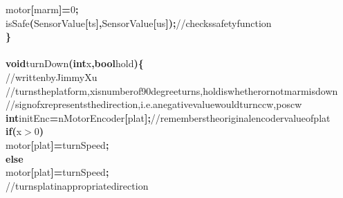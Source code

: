 \documentclass[a4paper, 10pt]{article}
\newcommand\SPC{\hspace*{0.6em}}
\newcommand\TAB{\hspace*{1.2em}}
\newcommand\HYP{\mbox{\char 45}}
\newcommand{\CppAComment}[1]{\textcolor[rgb]{0,0.5,0}{\colorbox[rgb]{1,1,1}{#1}}}
\newcommand{\CppAIdentifier}[1]{#1}
\newcommand{\CppANumber}[1]{\textcolor[rgb]{0,0,1}{\colorbox[rgb]{1,1,1}{#1}}}
\newcommand{\CppAReservedWord}[1]{\textbf{\colorbox[rgb]{1,1,1}{#1}}}
\newcommand{\CppASpace}[1]{\colorbox[rgb]{1,1,1}{#1}}
\newcommand{\CppASymbol}[1]{\textbf{\textcolor[rgb]{1,0,0}{\colorbox[rgb]{1,1,1}{#1}}}}
\begin{document}
\begin{ttfamily}
\CppASpace{\TAB }\CppAIdentifier{motor}\CppASymbol{[}\CppAIdentifier{marm}\CppASymbol{]}\CppASymbol{=}\CppANumber{0}\CppASymbol{;}\\
\CppASpace{\TAB }\CppAIdentifier{isSafe}\CppASymbol{(}\CppAIdentifier{SensorValue}\CppASymbol{[}\CppAIdentifier{ts}\CppASymbol{]}\CppASymbol{,}\CppASpace{\SPC }\CppAIdentifier{SensorValue}\CppASymbol{[}\CppAIdentifier{us}\CppASymbol{]}\CppASymbol{)}\CppASymbol{;}\CppASpace{\SPC }\CppAComment{//\SPC checks\SPC safety\SPC function}\\
\CppASymbol{\}}\\
\\
\CppAReservedWord{void}\CppASpace{\SPC }\CppAIdentifier{turnDown}\CppASymbol{(}\CppAReservedWord{int}\CppASpace{\SPC }\CppAIdentifier{x}\CppASymbol{,}\CppASpace{\SPC }\CppAReservedWord{bool}\CppASpace{\SPC }\CppAIdentifier{hold}\CppASymbol{)}\CppASymbol{\{}\\
\CppASpace{\TAB }\CppAComment{//\SPC written\SPC by\SPC Jimmy\SPC Xu}\\
\CppASpace{\TAB }\CppAComment{//\SPC turns\SPC the\SPC platform,\SPC x\SPC is\SPC number\SPC of\SPC 90\SPC degree\SPC turns,\SPC hold\SPC is\SPC whether\SPC or\SPC not\SPC marm\SPC is\SPC down}\\
\CppASpace{\TAB }\CppAComment{//\SPC sign\SPC of\SPC x\SPC represents\SPC the\SPC direction,\SPC i.e.\SPC a\SPC negative\SPC value\SPC would\SPC turn\SPC ccw,\SPC pos\SPC cw}\\
\CppASpace{\TAB }\CppAReservedWord{int}\CppASpace{\SPC }\CppAIdentifier{initEnc}\CppASymbol{=}\CppAIdentifier{nMotorEncoder}\CppASymbol{[}\CppAIdentifier{plat}\CppASymbol{]}\CppASymbol{;}\CppASpace{\SPC }\CppAComment{//\SPC remembers\SPC the\SPC original\SPC encoder\SPC value\SPC of\SPC plat}\\
\CppASpace{\TAB }\CppAReservedWord{if}\CppASpace{\SPC }\CppASymbol{(}\CppAIdentifier{x}\CppASymbol{$>$}\CppANumber{0}\CppASymbol{)}\\
\CppASpace{\TAB \TAB }\CppAIdentifier{motor}\CppASymbol{[}\CppAIdentifier{plat}\CppASymbol{]}\CppASymbol{=}\CppAIdentifier{turnSpeed}\CppASymbol{;}\\
\CppASpace{\TAB }\CppAReservedWord{else}\\
\CppASpace{\TAB \TAB }\CppAIdentifier{motor}\CppASymbol{[}\CppAIdentifier{plat}\CppASymbol{]}\CppASymbol{=}\CppASymbol{\HYP }\CppAIdentifier{turnSpeed}\CppASymbol{;}\\
\CppASpace{\TAB }\CppAComment{//\SPC turns\SPC plat\SPC in\SPC appropriate\SPC direction}\\

\end{ttfamily}
\end{document}
